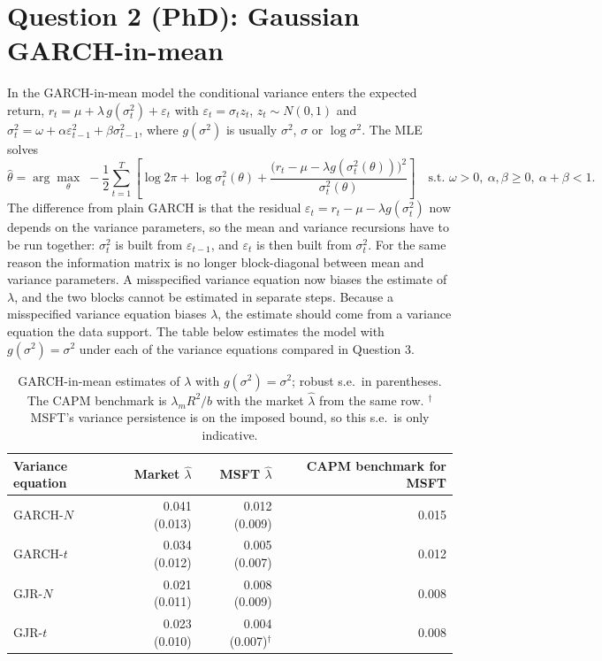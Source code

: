 \documentclass[11pt]{article}
\newcommand{\1}{\mathbf{1}}
\begin{document}
\section{Question 2 (PhD): Gaussian GARCH-in-mean}

In the GARCH-in-mean model the conditional variance enters the expected return,
$r_t=\mu+\lambda\,g(\sigma_t^2)+\varepsilon_t$ with $\varepsilon_t=\sigma_tz_t$,
$z_t\sim N(0,1)$ and $\sigma_t^2=\omega+\alpha\varepsilon_{t-1}^2+\beta\sigma_{t-1}^2$, where
$g(\sigma^2)$ is usually $\sigma^2$, $\sigma$ or $\log\sigma^2$. The MLE solves
\[
\hat\theta=\arg\max_{\theta}\; -\frac12\sum_{t=1}^T\left[\log2\pi+\log\sigma_t^2(\theta)
+\frac{\big(r_t-\mu-\lambda g(\sigma_t^2(\theta))\big)^2}{\sigma_t^2(\theta)}\right]
\quad\text{s.t. } \omega>0,\ \alpha,\beta\ge0,\ \alpha+\beta<1 .
\]
The difference from plain GARCH is that the residual $\varepsilon_t=r_t-\mu-\lambda
g(\sigma_t^2)$ now depends on the variance parameters, so the mean and variance recursions
have to be run together: $\sigma_t^2$ is built from $\varepsilon_{t-1}$, and $\varepsilon_t$
is then built from $\sigma_t^2$. For the same reason the information matrix is no longer
block-diagonal between mean and variance parameters. A misspecified variance equation now
biases the estimate of $\lambda$, and the two blocks cannot be estimated in separate steps.
Because a misspecified variance equation biases $\lambda$, the estimate should come from a
variance equation the data support. The table below estimates the model with
$g(\sigma^2)=\sigma^2$ under each of the variance equations compared in Question 3.

\begin{table}[!htb]
\centering
\small
\begin{tabular}{lrrr}
\toprule
Variance equation & Market $\hat\lambda$ & MSFT $\hat\lambda$ & CAPM benchmark for MSFT \\
\midrule
GARCH-$N$ & 0.041 (0.013) & 0.012 (0.009) & 0.015 \\
GARCH-$t$ & 0.034 (0.012) & 0.005 (0.007) & 0.012 \\
GJR-$N$   & 0.021 (0.011) & 0.008 (0.009) & 0.008 \\
GJR-$t$   & 0.023 (0.010) & 0.004 (0.007)$^\dagger$ & 0.008 \\
\bottomrule
\end{tabular}
\caption{GARCH-in-mean estimates of $\lambda$ with $g(\sigma^2)=\sigma^2$; robust s.e.\ in
parentheses. The CAPM benchmark is $\lambda_m R^2/b$ with the market $\hat\lambda$ from the
same row. $^\dagger$MSFT's variance persistence is on the imposed bound, so this s.e.\ is only
indicative.}
\label{tab:garchm}
\end{table}
\end{document}
